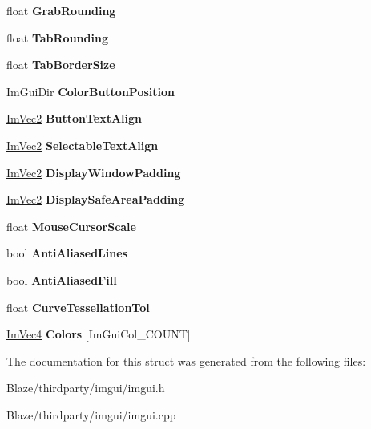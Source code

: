 \begin{DoxyCompactItemize}
float {\bfseries Grab\+Rounding}
\item 
\mbox{\label{structImGuiStyle_a22d2fd87b928e639b4d2d1dbbcf805f8}} 
float {\bfseries Tab\+Rounding}
\item 
\mbox{\label{structImGuiStyle_a25858b1cc9234cbb976c934586fc4d88}} 
float {\bfseries Tab\+Border\+Size}
\item 
\mbox{\label{structImGuiStyle_a64b5fdd495573fa07a80dc0071e99802}} 
Im\+Gui\+Dir {\bfseries Color\+Button\+Position}
\item 
\mbox{\label{structImGuiStyle_a17246b12f4e069229d21808a87f78514}} 
\hyperlink{structImVec2}{Im\+Vec2} {\bfseries Button\+Text\+Align}
\item 
\mbox{\label{structImGuiStyle_af2dc57060ca88884846dadbf455785c9}} 
\hyperlink{structImVec2}{Im\+Vec2} {\bfseries Selectable\+Text\+Align}
\item 
\mbox{\label{structImGuiStyle_ab06d6f0c6c5f36ab0c14688448de66f6}} 
\hyperlink{structImVec2}{Im\+Vec2} {\bfseries Display\+Window\+Padding}
\item 
\mbox{\label{structImGuiStyle_a8dd02a6a031ec8667e76aab1e28755bd}} 
\hyperlink{structImVec2}{Im\+Vec2} {\bfseries Display\+Safe\+Area\+Padding}
\item 
\mbox{\label{structImGuiStyle_a6448eb2273c8868d7ecccf1152857f68}} 
float {\bfseries Mouse\+Cursor\+Scale}
\item 
\mbox{\label{structImGuiStyle_a0164b54454297971d40f3578b2c1ffeb}} 
bool {\bfseries Anti\+Aliased\+Lines}
\item 
\mbox{\label{structImGuiStyle_a1fcc22c258a2a73bd61efd18e7ce7e5a}} 
bool {\bfseries Anti\+Aliased\+Fill}
\item 
\mbox{\label{structImGuiStyle_a41eb9377b63b8b85ab807c28e00198e9}} 
float {\bfseries Curve\+Tessellation\+Tol}
\item 
\mbox{\label{structImGuiStyle_a2b4941240a38d1300c39a7fa4f03d0a3}} 
\hyperlink{structImVec4}{Im\+Vec4} {\bfseries Colors} \mbox{[}Im\+Gui\+Col\+\_\+\+C\+O\+U\+NT\mbox{]}
\end{DoxyCompactItemize}


The documentation for this struct was generated from the following files\+:\begin{DoxyCompactItemize}
\item 
Blaze/thirdparty/imgui/imgui.\+h\item 
Blaze/thirdparty/imgui/imgui.\+cpp\end{DoxyCompactItemize}

